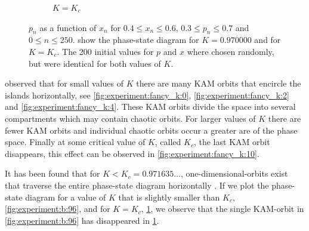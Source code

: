 \begin{figure}
\begin{subfigure}{\columnwidth}
		\caption{$K = K_c$}
		\label{fig:experiment:b:KC}
	\end{subfigure}	
	\caption{$p_n$ as a function of $x_n$ for $0.4 \leq x_n \leq 0.6$, $0.3 \leq p_n \leq 0.7$ and $0 \leq n \leq 250$.  show the phase-state diagram for $K = 0.970000$ and  for $K = K_c$. The 200 initial values for $p$ and $x$ where chosen randomly, but were identical for both values of $K$.}
	\label{fig:experiment:b:testKC}
\end{figure}

\citeauthor{greene1979method} observed that for small values of $K$ there are many KAM orbits that encircle the islands horizontally, see \cref{fig:experiment:fancy_k:0}, \ref{fig:experiment:fancy_k:2} and \ref{fig:experiment:fancy_k:4}. These KAM orbits divide the space into several compartments which may contain chaotic orbits. For larger values of $K$ there are fewer KAM orbits and individual chaotic orbits occur a greater are of the phase space. Finally at some critical value of $K$, called $K_c$, the last KAM orbit disappears, this effect can be observed in \cref{fig:experiment:fancy_k:10}. 

It has been found that for $K < K_c = 0.971635\dotsc$, one-dimensional-orbits exist that traverse the entire phase-state diagram horizontally \cite{kenzel1997physics}. If we plot the phase-state diagram for a value of $K$ that is slightly smaller than $K_c$, \cref{fig:experiment:b:96}, and for $K = K_c$, \cref{fig:experiment:b:KC}, we observe that the single KAM-orbit in \cref{fig:experiment:b:96} has disappeared in \cref{fig:experiment:b:KC}. 

